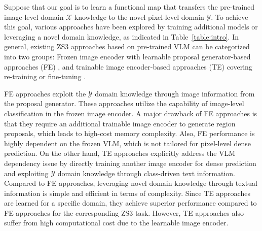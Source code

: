 \documentclass[nohyperref]{article}
\theoremstyle{plain}
\theoremstyle{definition}
\theoremstyle{remark}
\begin{document}
Suppose that our goal is to learn a functional map that transfers the pre-trained image-level domain $\mathcal{X}$ knowledge to the novel pixel-level domain $\mathcal{Y}$. %
To achieve this goal, various approaches have been explored by training additional models or leveraging a novel domain knowledge, 
as indicated in Table~\ref{table:intro}.
In general, existing ZS3 approaches based on pre-trained VLM can be categorized into two groups: Frozen image encoder with learnable proposal generator-based approaches (FE) \cite{ding2022zegformer, xu2021zsseg}, and trainable image encoder-based approaches (TE) covering re-training or fine-tuning \cite{rao2022denseclip, zhou2022zegclip}. 




FE approaches exploit the $\mathcal{Y}$ domain knowledge through image information from the proposal generator. These approaches utilize the capability of image-level classification in the frozen image encoder.
A major drawback of FE approaches is that they require an additional trainable image encoder to generate region proposals, which leads to high-cost memory complexity. Also, FE performance is highly dependent on the frozen VLM, which is not tailored for pixel-level dense prediction.
On the other hand, TE approaches explicitly address the VLM dependency issue by directly training another image encoder for dense prediction and exploiting $\mathcal{Y}$ domain knowledge through class-driven text information.
Compared to FE approaches, leveraging novel domain knowledge through textual information is simple and efficient in terms of complexity.  
Since TE approaches are learned for a specific domain, they achieve superior performance compared to FE approaches for the corresponding ZS3 task.
However, TE approaches also suffer from high computational cost due to the learnable image encoder. %
\end{document}
